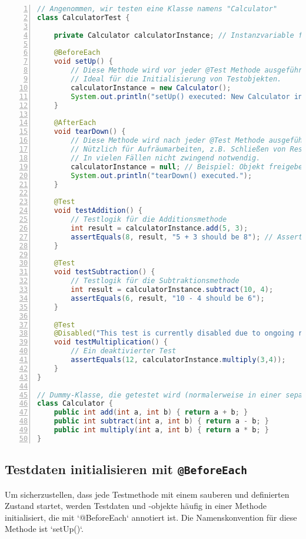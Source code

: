 \begin{lstlisting}[language=Java, caption={Grundgerüst einer JUnit Testklasse}, label=lst:junit_test_class_structure, basicstyle=\ttfamily\footnotesize, breaklines=true, frame=tb, numbers=left]
// Angenommen, wir testen eine Klasse namens "Calculator"
class CalculatorTest {

    private Calculator calculatorInstance; // Instanzvariable für das Testobjekt

    @BeforeEach
    void setUp() {
        // Diese Methode wird vor jeder @Test Methode ausgeführt.
        // Ideal für die Initialisierung von Testobjekten.
        calculatorInstance = new Calculator();
        System.out.println("setUp() executed: New Calculator instance created.");
    }

    @AfterEach
    void tearDown() {
        // Diese Methode wird nach jeder @Test Methode ausgeführt.
        // Nützlich für Aufräumarbeiten, z.B. Schließen von Ressourcen.
        // In vielen Fällen nicht zwingend notwendig.
        calculatorInstance = null; // Beispiel: Objekt freigeben
        System.out.println("tearDown() executed.");
    }

    @Test
    void testAddition() {
        // Testlogik für die Additionsmethode
        int result = calculatorInstance.add(5, 3);
        assertEquals(8, result, "5 + 3 should be 8"); // Assertion mit optionaler Nachricht
    }

    @Test
    void testSubtraction() {
        // Testlogik für die Subtraktionsmethode
        int result = calculatorInstance.subtract(10, 4);
        assertEquals(6, result, "10 - 4 should be 6");
    }
    
    @Test
    @Disabled("This test is currently disabled due to ongoing refactoring.")
    void testMultiplication() {
        // Ein deaktivierter Test
        assertEquals(12, calculatorInstance.multiply(3,4));
    }
}

// Dummy-Klasse, die getestet wird (normalerweise in einer separaten Datei)
class Calculator {
    public int add(int a, int b) { return a + b; }
    public int subtract(int a, int b) { return a - b; }
    public int multiply(int a, int b) { return a * b; }
}
\end{lstlisting}

\subsection{Testdaten initialisieren mit \texttt{@BeforeEach}}
\label{ssec:junit_beforeeach}
Um sicherzustellen, dass jede Testmethode mit einem sauberen und definierten Zustand startet, werden Testdaten und -objekte häufig in einer Methode initialisiert, die mit `@BeforeEach` annotiert ist. Die Namenskonvention für diese Methode ist `setUp()`.

